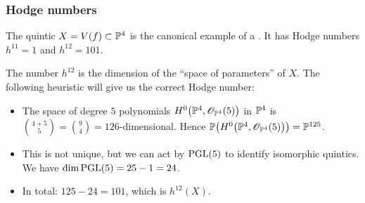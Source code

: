 
\begin{frame}
\frametitle{Hodge numbers}

The quintic $X = V(f) \subset \P^4$ is the canonical example of a \CY. It has Hodge numbers $h^{11}=1$ and $h^{12}=101$.

\begin{remark}[Heuristic]
    The number $h^{12}$ is the dimension of the ``space of parameters'' of $X$. The following heuristic will give us the correct Hodge number:
    \begin{itemize}
	    \item
	    The space of degree $5$ polynomials $H^0\big(\P^4, \OO_{\P^4}(5)\big)$ in $\P^4$ is $\binom{4 + 5}{5} = \binom{9}{4} = 126$-dimensional. Hence $\P\big(H^0\big(\P^4, \OO_{\P^4}(5)\big)\big) = \P^{125}$.

	    \item
	    This is not unique, but we can act by $\PGL(5)$ to identify isomorphic quintics. We have $\dim \PGL(5)=25-1=24$.

	    \item
	    In total: $125 - 24 = 101$, which is $h^{12}(X)$.
    \end{itemize}
\end{remark}

\end{frame}